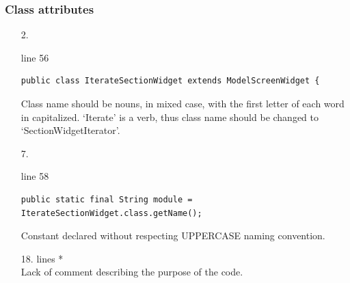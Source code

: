 \documentclass[english]{article}
\begin{document}
\subsubsection*{Class attributes }	
\begin{itemize}

\item[2.]{line 56
		\begin{lstlisting} 
public class IterateSectionWidget extends ModelScreenWidget {
		\end{lstlisting}
		Class name should be nouns, in mixed case, with the first letter of each word
in capitalized. `Iterate' is a verb, thus class name should be changed to `SectionWidgetIterator'.}

\item[7.]{line 58
		\begin{lstlisting} 
public static final String module = IterateSectionWidget.class.getName();
		\end{lstlisting}
		Constant declared without respecting UPPERCASE naming convention.}

		\item[18.]{lines  *\\
		Lack of comment describing the purpose of the code.}
\end{itemize}
\end{document}
